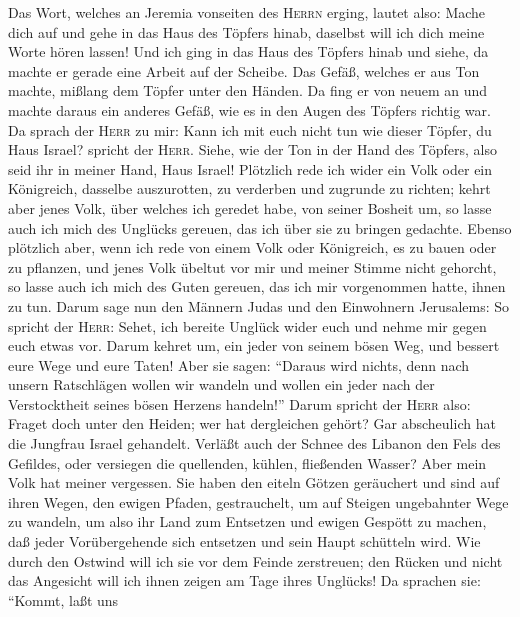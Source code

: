  Das Wort, welches an Jeremia vonseiten des \textsc{Herrn}
erging, lautet also:  Mache dich auf und gehe in das Haus
des Töpfers hinab, daselbst will ich dich meine Worte hören lassen!
 Und ich ging in das Haus des Töpfers hinab und siehe, da
machte er gerade eine Arbeit auf der Scheibe.  Das Gefäß,
welches er aus Ton machte, mißlang dem Töpfer unter den Händen. Da fing
er von neuem an und machte daraus ein anderes Gefäß, wie es in den Augen
des Töpfers richtig war.  Da sprach der \textsc{Herr} zu
mir:  Kann ich mit euch nicht tun wie dieser Töpfer, du
Haus Israel? spricht der \textsc{Herr}. Siehe, wie der Ton in der Hand
des Töpfers, also seid ihr in meiner Hand, Haus Israel! 
Plötzlich rede ich wider ein Volk oder ein Königreich, dasselbe
auszurotten, zu verderben und zugrunde zu richten;  kehrt
aber jenes Volk, über welches ich geredet habe, von seiner Bosheit um,
so lasse auch ich mich des Unglücks gereuen, das ich über sie zu bringen
gedachte.  Ebenso plötzlich aber, wenn ich rede von einem
Volk oder Königreich, es zu bauen oder zu pflanzen,  und
jenes Volk übeltut vor mir und meiner Stimme nicht gehorcht, so lasse
auch ich mich des Guten gereuen, das ich mir vorgenommen hatte, ihnen zu
tun.  Darum sage nun den Männern Judas und den Einwohnern
Jerusalems: So spricht der \textsc{Herr}: Sehet, ich bereite Unglück
wider euch und nehme mir gegen euch etwas vor. Darum kehret um, ein
jeder von seinem bösen Weg, und bessert eure Wege und eure Taten!
 Aber sie sagen: ``Daraus wird nichts, denn nach unsern
Ratschlägen wollen wir wandeln und wollen ein jeder nach der
Verstocktheit seines bösen Herzens handeln!''  Darum
spricht der \textsc{Herr} also: Fraget doch unter den Heiden; wer hat
dergleichen gehört? Gar abscheulich hat die Jungfrau Israel gehandelt.
 Verläßt auch der Schnee des Libanon den Fels des
Gefildes, oder versiegen die quellenden, kühlen, fließenden Wasser? Aber
mein Volk hat meiner vergessen.  Sie haben den eiteln
Götzen geräuchert und sind auf ihren Wegen, den ewigen Pfaden,
gestrauchelt, um auf Steigen ungebahnter Wege zu wandeln,
 um also ihr Land zum Entsetzen und ewigen Gespött zu
machen, daß jeder Vorübergehende sich entsetzen und sein Haupt schütteln
wird.  Wie durch den Ostwind will ich sie vor dem Feinde
zerstreuen; den Rücken und nicht das Angesicht will ich ihnen zeigen am
Tage ihres Unglücks!  Da sprachen sie: ``Kommt, laßt uns
